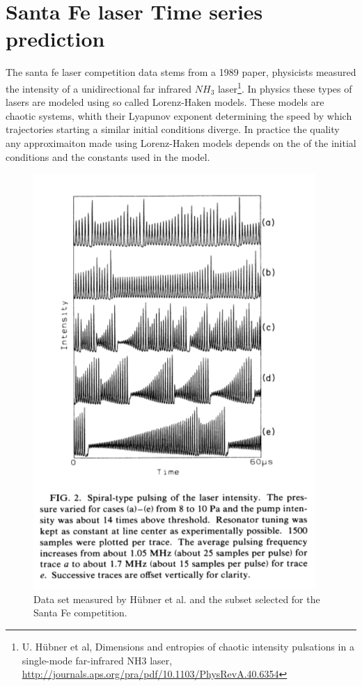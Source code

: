 \section{Santa Fe laser Time series prediction}
The santa fe laser competition data stems from a 1989 paper, physicists measured the intensity of a unidirectional far infrared $NH_3$ laser\footnote{U. H\"{u}bner et al, Dimensions and entropies of chaotic intensity pulsations in a single-mode far-infrared NH3 laser, \url{http://journals.aps.org/pra/pdf/10.1103/PhysRevA.40.6354}}. In physics these types of lasers are modeled using so called Lorenz-Haken models. These models are chaotic systems, whith their Lyapunov exponent determining the speed by which trajectories starting a similar initial conditions diverge. In practice the quality any approximaiton made using Lorenz-Haken models depends on the of the initial conditions and the constants used in the model. 
\begin{figure}
\centering
\includegraphics[scale = 0.25]{../src/figure/origPaper.png}

\caption{Data set measured by H\"{u}bner et al. and the subset selected for the Santa Fe competition.}
\label{fig:origAndSel}
\end{figure}
